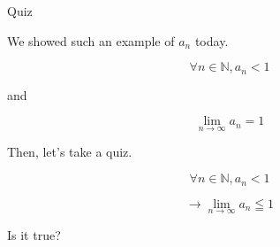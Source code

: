 %
%


\begin{frame}[c]{}{}
  {\large Quiz}
\end{frame}

\begin{frame}[c]{}{}
  We showed such an example of $a_n$ today.

  \vspace{2ex}

  $$\forall n \in \mathbb{N}, a_n < 1$$

  \vspace{2ex}

  and

  \vspace{2ex}

  $$\lim_{n \to \infty} a_n = 1$$
\end{frame}

\begin{frame}[c]{}{}
  Then, let's take a quiz.

  \vspace{2ex}

  $$\forall n \in \mathbb{N}, a_n < 1$$

  \vspace{2ex}

  $$\to \lim_{n \to \infty} a_n \leqq 1$$

  \vspace{2ex}

  Is it true?
\end{frame}
